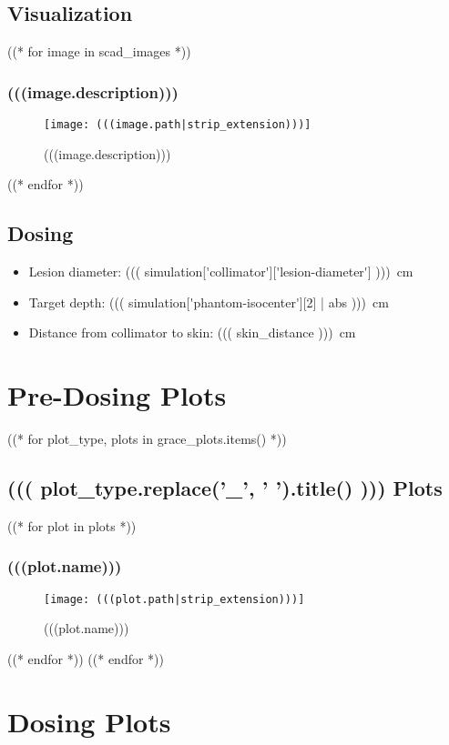 \documentclass[12pt]{article}
\begin{document}
\subsection{Visualization}
((* for image in scad_images *))
	\subsubsection{(((image.description)))}
	\begin{figure}[H]
	\centering
	\texttt{[image: (((image.path|strip\_extension)))]}
	\caption{(((image.description)))}
	\end{figure}
((* endfor *))

\subsection{Dosing}
\begin{itemize}
	\item Lesion diameter: \SI{((( simulation['collimator']['lesion-diameter']  )))}{\cm}
	\item Target depth: \SI{((( simulation['phantom-isocenter'][2] | abs )))}{\cm}
	\item Distance from collimator to skin: \SI{((( skin_distance )))}{\cm}
\end{itemize}

\section{Pre-Dosing Plots}
((* for plot_type, plots in grace_plots.items() *))
	\subsection{((( plot_type.replace('_', ' ').title() ))) Plots}
		((* for plot in plots *))
			\subsubsection{(((plot.name)))}
			\begin{figure}[H]
			\centering
			\texttt{[image: (((plot.path|strip\_extension)))]}
			\caption{(((plot.name)))}
			\label{fig:(((plot.slug)))}
			\end{figure}
		((* endfor *))
((* endfor *))

\section{Dosing Plots}
\end{document}
